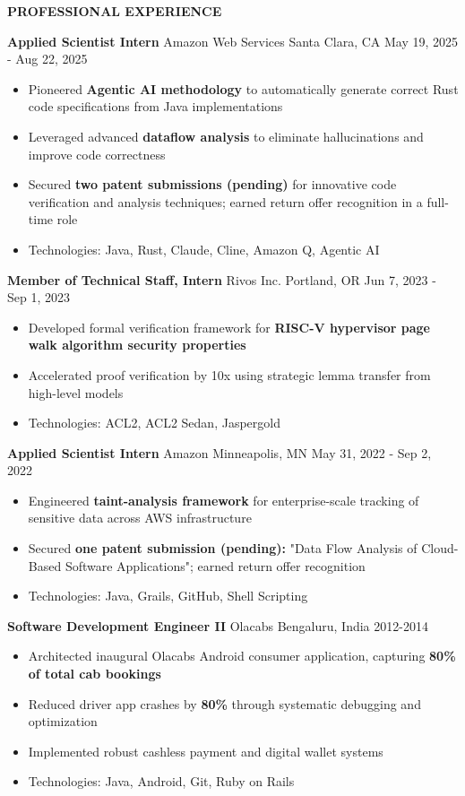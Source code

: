 \documentclass[11pt,letterpaper]{article}
\newcommand{\cvsection}[1]{
    \vspace{0.6em}
    {\color{darkblue}\textbf{\Large #1}}
    \vspace{0.15em}
    \textcolor{lightblue}{\hrulefill}
    \vspace{0.4em}
}
\newcommand{\cvsubsection}[4]{
    \textbf{#1} \textcolor{mediumgray}{\textbullet} #2 \textcolor{mediumgray}{\textbullet} #3 \textcolor{mediumgray}{\textbullet} #4
}
\begin{document}
\cvsection{PROFESSIONAL EXPERIENCE}

\cvsubsection{Applied Scientist Intern}{Amazon Web Services}{Santa Clara, CA}{May 19, 2025 - Aug 22, 2025}
\begin{itemize}
    \item Pioneered \textbf{Agentic AI methodology} to automatically generate correct Rust code specifications from Java implementations
    \item Leveraged advanced \textbf{dataflow analysis} to eliminate hallucinations and improve code correctness
    \item Secured \textbf{two patent submissions (pending)} for innovative code verification and analysis techniques; earned return offer recognition in a full-time role
    \item Technologies: Java, Rust, Claude, Cline, Amazon Q, Agentic AI
\end{itemize}

\cvsubsection{Member of Technical Staff, Intern}{Rivos Inc.}{Portland, OR}{Jun 7, 2023 - Sep 1, 2023}
\begin{itemize}
    \item Developed formal verification framework for \textbf{RISC-V hypervisor page walk algorithm security properties}
    \item Accelerated proof verification by 10x using strategic lemma transfer from high-level models
    \item Technologies: ACL2, ACL2 Sedan, Jaspergold
\end{itemize}

\cvsubsection{Applied Scientist Intern}{Amazon}{Minneapolis, MN}{May 31, 2022 - Sep 2, 2022}
\begin{itemize}
    \item Engineered \textbf{taint-analysis framework} for enterprise-scale tracking of sensitive data across AWS infrastructure
    \item Secured \textbf{one patent submission (pending):} "Data Flow Analysis of Cloud-Based Software Applications"; earned return offer recognition
    \item Technologies: Java, Grails, GitHub, Shell Scripting
\end{itemize}

\cvsubsection{Software Development Engineer II}{Olacabs}{Bengaluru, India}{2012-2014}
\begin{itemize}
    \item Architected inaugural Olacabs Android consumer application, capturing \textbf{80\% of total cab bookings}
    \item Reduced driver app crashes by \textbf{80\%} through systematic debugging and optimization
    \item Implemented robust cashless payment and digital wallet systems
    \item Technologies: Java, Android, Git, Ruby on Rails
\end{itemize}
\end{document}
